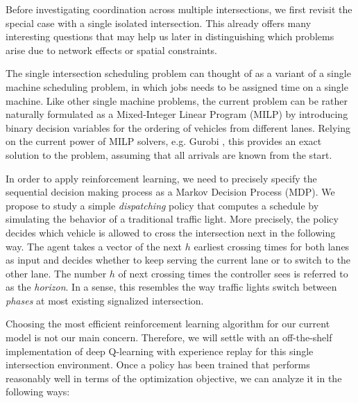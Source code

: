 \documentclass{article}
\begin{document}
Before investigating coordination across multiple intersections, we first
revisit the special case with a single isolated intersection. This already
offers many interesting questions that may help us later in distinguishing which
problems arise due to network effects or spatial constraints.


The single intersection scheduling problem can thought of as a variant of a
single machine scheduling problem, in which jobs needs to be assigned time on a
single machine. Like other single machine problems, the current problem can be
rather naturally formulated as a Mixed-Integer Linear Program (MILP) by introducing
binary decision variables for the ordering of vehicles from different lanes.
Relying on the current power of MILP solvers, e.g. Gurobi \cite{gurobi}, this
provides an exact solution to the problem, assuming that all arrivals are known
from the start.


In order to apply reinforcement learning, we need to precisely specify the
sequential decision making process as a Markov Decision Process (MDP). We propose
to study a simple \textit{dispatching} policy that computes a schedule by
simulating the behavior of a traditional traffic light. More precisely, the
policy decides which vehicle is allowed to cross the intersection next in the
following way. The agent takes a vector of the next $h$ earliest crossing times
for both lanes as input and decides whether to keep serving the current lane or
to switch to the other lane. The number $h$ of next crossing times the
controller sees is referred to as the \textit{horizon}. In a sense, this
resembles the way traffic lights switch between \textit{phases} at most existing
signalized intersection.


Choosing the most efficient reinforcement learning algorithm for our current
model is not our main concern. Therefore, we will settle with an off-the-shelf
implementation of deep Q-learning with experience replay
\cite{mnih_human-level_2015} for this single intersection environment. Once a
policy has been trained that performs reasonably well in terms of the
optimization objective, we can analyze it in the following ways:
\end{document}
